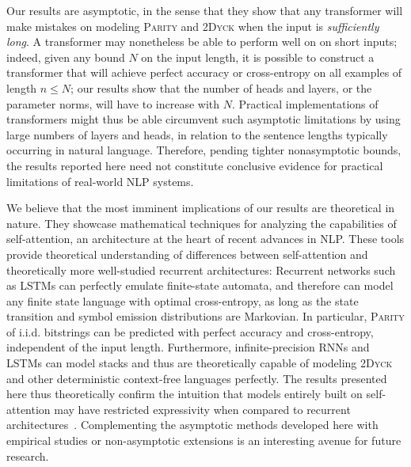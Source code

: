 \documentclass[11pt,a4paper]{article}
\begin{document}
Our results are asymptotic, in the sense that they show that any transformer will make mistakes on modeling \textsc{Parity} and \textsc{2Dyck} when the input is \emph{sufficiently long}.
A transformer may nonetheless be able to perform well on on short inputs; indeed, given any bound $N$ on the input length, it is possible to construct a transformer that will achieve perfect accuracy or cross-entropy on all examples of length $n \leq N$; our results show that the number of heads and layers, or the parameter norms, will have to increase with $N$.
Practical implementations of transformers might thus be able circumvent such asymptotic limitations by using large numbers of layers and heads, in relation to the sentence lengths typically occurring in natural language.
Therefore, pending tighter nonasymptotic bounds, the results reported here need not constitute conclusive evidence for practical limitations of real-world NLP systems.





We believe that the most imminent implications of our results are theoretical in nature.
They showcase mathematical techniques for analyzing the capabilities of self-attention, an architecture at the heart of recent advances in NLP.
These tools provide theoretical understanding of differences between self-attention and theoretically more well-studied recurrent architectures:
Recurrent networks such as LSTMs can perfectly emulate finite-state automata, and therefore can model any finite state language with optimal cross-entropy, as long as the state transition and symbol emission distributions are Markovian.
In particular, \textsc{Parity} of i.i.d. bitstrings can be predicted with perfect accuracy and cross-entropy, independent of the input length.
Furthermore, infinite-precision RNNs and LSTMs can model stacks \cite{tabor2000fractal,gruning2006stack,kirov2012processing} and thus are theoretically capable of modeling \textsc{2Dyck} and other deterministic context-free languages perfectly.
The results presented here thus theoretically confirm the intuition that models entirely built on self-attention may have restricted expressivity when compared to recurrent architectures~\cite{tran2018importance,dehghani2018universal,shen2018disan,chen2018best,hao2019modeling}.
Complementing the asymptotic methods developed here with empirical studies or non-asymptotic extensions is an interesting avenue for future research.
\end{document}
